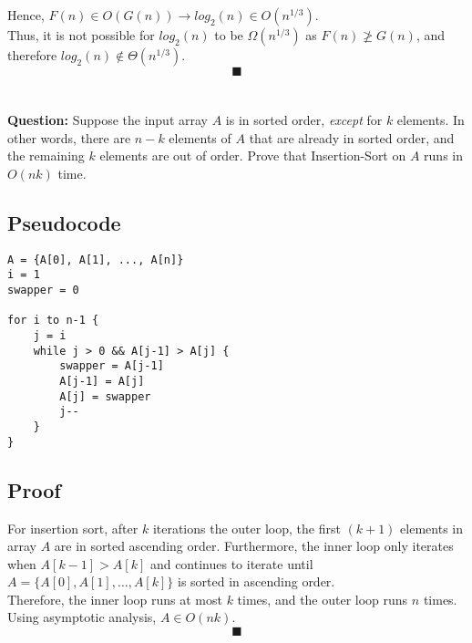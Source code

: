 \documentclass[a4paper,12pt]{article}
\begin{document}
Hence, $F(n) \in O(G(n)) \rightarrow log_2(n) \in O(n^{1/3})$.\\

Thus, it is not possible for $log_2(n)$ to be $\Omega(n^{1/3})$ as $F(n) \ngeq G(n)$, and therefore $log_2(n) \notin \Theta(n^{1/3})$.\\

$$\blacksquare$$

\section{}

\textbf{Question:} Suppose the input array $A$ is in sorted order,
\emph{except} for $k$ elements. In other words, there are $n-k$ elements of $A$ that
are already in sorted order, and the remaining $k$ elements are out of order. Prove
that Insertion-Sort on $A$ runs in $O(nk)$ time.\\

\subsection{Pseudocode}

\begin{verbatim}
A = {A[0], A[1], ..., A[n]}
i = 1
swapper = 0

for i to n-1 {
    j = i
    while j > 0 && A[j-1] > A[j] {
        swapper = A[j-1]
        A[j-1] = A[j]
        A[j] = swapper                        
        j--
    }
}
\end{verbatim}

\subsection{Proof}
For insertion sort, after $k$ iterations the outer loop, the first $(k+1)$ elements in array $A$ are in sorted ascending order. Furthermore, the inner loop only iterates when $A[k-1] > A[k]$ and continues to iterate until $A=\{A[0], A[1], \ldots, A[k]\}$ is sorted in ascending order.\\

Therefore, the inner loop runs at most $k$ times, and the outer loop runs $n$ times. Using asymptotic analysis, $A \in O(nk)$.\\

$$\blacksquare$$
\end{document}
